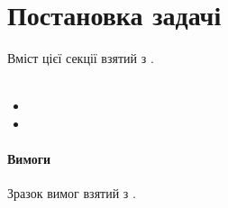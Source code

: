 \sffamily

\section{Постановка задачі}
Вміст цієї секції взятий з \cite{CSHPiskunov}.\\
\\
\begin{itemize}
	\item
	\item
\end{itemize}

\paragraph{Вимоги}
Зразок вимог взятий з \cite{kulikov}. 
